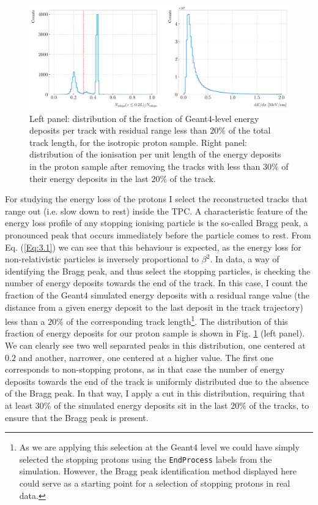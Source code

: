 \begin{figure}[t]
	\centering
	\includegraphics[width=.99\linewidth]{Images/GArSoft_PID/dEdx/geant_selection_dEdx.pdf}
	\caption[Distribution of the fraction of energy deposits with residual range less than $20\%$ of the total track length, and distribution of the ionisation per unit length after removing the tracks with less than $30\%$ of their energy deposits in the last $20\%$ of the track.]{Left panel: distribution of the fraction of Geant4-level energy deposits per track with residual range less than $20\%$ of the total track length, for the isotropic proton sample. Right panel: distribution of the ionisation per unit length of the energy deposits in the proton sample after removing the tracks with less than $30\%$ of their energy deposits in the last $20\%$ of the track.}
	\label{fig:geant_edeps}
\end{figure}

For studying the energy loss of the protons I select the reconstructed tracks that range out (i.e. slow down to rest) inside the TPC. A characteristic feature of the energy loss profile of any stopping ionising particle is the so-called Bragg peak, a pronounced peak that occurs immediately before the particle comes to rest. From Eq. (\ref{Eq:3.1}) we can see that this behaviour is expected, as the energy loss for non-relativistic particles is inversely proportional to $\beta^{2}$. In data, a way of identifying the Bragg peak, and thus select the stopping particles, is checking the number of energy deposits towards the end of the track. In this case, I count the fraction of the Geant4 simulated energy deposits with a residual range value (the distance from a given energy deposit to the last deposit in the track trajectory) less than a $20\%$ of the corresponding track length\footnote{As we are applying this selection at the Geant4 level we could have simply selected the stopping protons using the \texttt{EndProcess} labels from the simulation. However, the Bragg peak identification method displayed here could serve as a starting point for a selection of stopping protons in real data.}. The distribution of this fraction of energy deposits for our proton sample is shown in Fig. \ref{fig:geant_edeps} (left panel). We can clearly see two well separated peaks in this distribution, one centered at $0.2$ and another, narrower, one centered at a higher value. The first one corresponds to non-stopping protons, as in that case the number of energy deposits towards the end of the track is uniformly distributed due to the absence of the Bragg peak. In that way, I apply a cut in this distribution, requiring that at least $30\%$ of the simulated energy deposits sit in the last $20\%$ of the tracks, to ensure that the Bragg peak is present.


